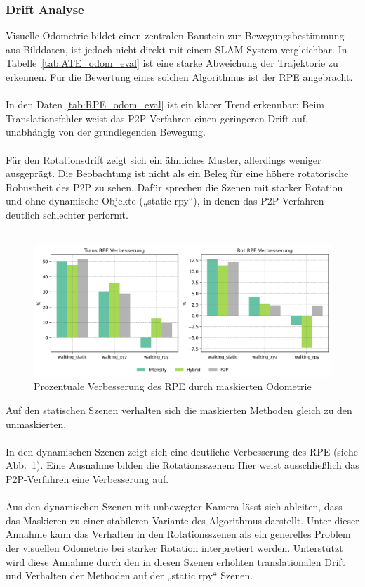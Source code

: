 \documentclass[12pt,DIV=15,BCOR=15mm,twoside,headsepline,abstract=true,listof=totoc,bibliography=totoc]{scrreprt}
\theoremstyle{remark}    %
\begin{document}
    \subsubsection{Drift Analyse}
    Visuelle Odometrie bildet einen zentralen Baustein zur Bewegungsbestimmung aus Bilddaten, ist jedoch nicht direkt mit einem \ac{SLAM}-System vergleichbar. 
    In Tabelle~\ref{tab:ATE_odom_eval} ist eine starke Abweichung der Trajektorie zu erkennen. Für die Bewertung eines solchen Algorithmus ist der \ac{RPE} 
    angebracht.\\\\
    In den Daten \ref{tab:RPE_odom_eval} ist ein klarer Trend erkennbar: Beim Translationsfehler weist das \ac{P2P}-Verfahren einen geringeren Drift auf, 
    unabhängig von der grundlegenden Bewegung. \\\\
    Für den Rotationsdrift zeigt sich ein ähnliches Muster, allerdings weniger ausgeprägt. Die Beobachtung ist nicht als ein Beleg für eine höhere rotatorische 
    Robustheit des \ac{P2P} zu sehen.
    Dafür sprechen die Szenen mit starker Rotation und ohne dynamische Objekte („static rpy“), in denen das \ac{P2P}-Verfahren deutlich schlechter 
    performt.\\\\
    \begin{figure}[ht]
        \centering
        \includegraphics[width=\textwidth]{pics/rel_imp_walking_rpy.png}
        \caption{Prozentuale Verbesserung des RPE durch maskierten Odometrie}
        \label{fig:rel_imp_odom_RPE}
    \end{figure}   
    Auf den statischen Szenen verhalten sich die maskierten Methoden gleich zu den unmaskierten.\\\\
    In den dynamischen Szenen zeigt sich eine deutliche Verbesserung des \ac{RPE} (siehe Abb.~\ref{fig:rel_imp_odom_RPE}). Eine Ausnahme bilden die Rotationsszenen: 
    Hier weist ausschließlich das \ac{P2P}-Verfahren eine Verbesserung auf. \\\\
    Aus den dynamischen Szenen mit unbewegter Kamera lässt sich ableiten, dass das Maskieren zu einer stabileren Variante des Algorithmus darstellt.
    Unter dieser Annahme kann das Verhalten in den Rotationsszenen als ein generelles Problem der visuellen Odometrie bei starker Rotation interpretiert werden.
    Unterstützt wird diese Annahme durch den in diesen Szenen erhöhten translationalen Drift und Verhalten der Methoden auf der „static rpy“ Szenen.
    
\end{document}
